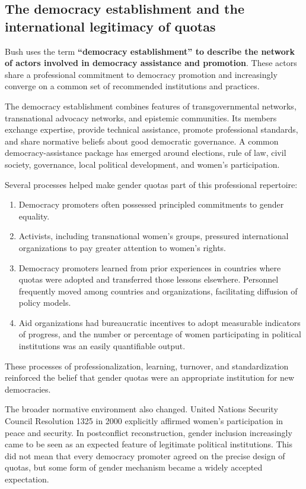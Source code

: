 \subsection{The democracy establishment and the international legitimacy of quotas}

Bush uses the term \textbf{``democracy establishment'' to describe the network of actors involved in democracy assistance and promotion}. These actors share a professional commitment to democracy promotion and increasingly converge on a common set of recommended institutions and practices.

The democracy establishment combines features of transgovernmental networks, transnational advocacy networks, and epistemic communities. Its members exchange expertise, provide technical assistance, promote professional standards, and share normative beliefs about good democratic governance. A common democracy-assistance package has emerged around elections, rule of law, civil society, governance, local political development, and women's participation.

Several processes helped make gender quotas part of this professional repertoire:
\begin{enumerate}
    \item Democracy promoters often possessed principled commitments to gender equality.
    \item Activists, including transnational women's groups, pressured international organizations to pay greater attention to women's rights.
    \item Democracy promoters learned from prior experiences in countries where quotas were adopted and transferred those lessons elsewhere. Personnel frequently moved among countries and organizations, facilitating diffusion of policy models.
    \item Aid organizations had bureaucratic incentives to adopt measurable indicators of progress, and the number or percentage of women participating in political institutions was an easily quantifiable output.
\end{enumerate}

These processes of professionalization, learning, turnover, and standardization reinforced the belief that gender quotas were an appropriate institution for new democracies.

The broader normative environment also changed. United Nations Security Council Resolution 1325 in 2000 explicitly affirmed women's participation in peace and security. In postconflict reconstruction, gender inclusion increasingly came to be seen as an expected feature of legitimate political institutions. This did not mean that every democracy promoter agreed on the precise design of quotas, but some form of gender mechanism became a widely accepted expectation.

